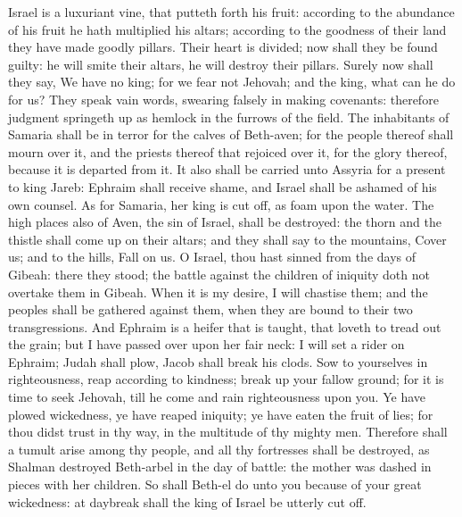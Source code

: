 Israel is a luxuriant vine, that putteth forth his fruit: according to the abundance of his fruit he hath multiplied his altars; according to the goodness of their land they have made goodly pillars. Their heart is divided; now shall they be found guilty: he will smite their altars, he will destroy their pillars. Surely now shall they say, We have no king; for we fear not Jehovah; and the king, what can he do for us?  They speak vain words, swearing falsely in making covenants: therefore judgment springeth up as hemlock in the furrows of the field. The inhabitants of Samaria shall be in terror for the calves of Beth-aven; for the people thereof shall mourn over it, and the priests thereof that rejoiced over it, for the glory thereof, because it is departed from it. It also shall be carried unto Assyria for a present to king Jareb: Ephraim shall receive shame, and Israel shall be ashamed of his own counsel. As for Samaria, her king is cut off, as foam upon the water. The high places also of Aven, the sin of Israel, shall be destroyed: the thorn and the thistle shall come up on their altars; and they shall say to the mountains, Cover us; and to the hills, Fall on us.  O Israel, thou hast sinned from the days of Gibeah: there they stood; the battle against the children of iniquity doth not overtake them in Gibeah. When it is my desire, I will chastise them; and the peoples shall be gathered against them, when they are bound to their two transgressions. And Ephraim is a heifer that is taught, that loveth to tread out the grain; but I have passed over upon her fair neck: I will set a rider on Ephraim; Judah shall plow, Jacob shall break his clods.  Sow to yourselves in righteousness, reap according to kindness; break up your fallow ground; for it is time to seek Jehovah, till he come and rain righteousness upon you. Ye have plowed wickedness, ye have reaped iniquity; ye have eaten the fruit of lies; for thou didst trust in thy way, in the multitude of thy mighty men. Therefore shall a tumult arise among thy people, and all thy fortresses shall be destroyed, as Shalman destroyed Beth-arbel in the day of battle: the mother was dashed in pieces with her children. So shall Beth-el do unto you because of your great wickedness: at daybreak shall the king of Israel be utterly cut off. 

